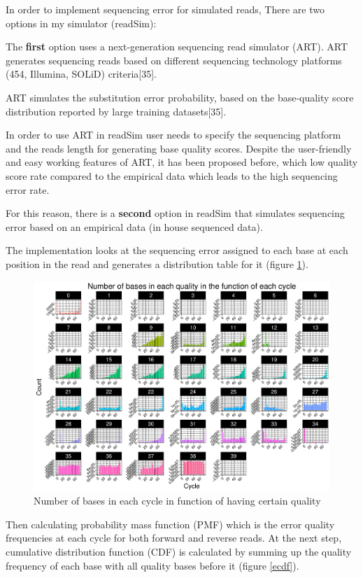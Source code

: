 \documentclass[11pt,a4paper]{report}
\begin{document}
In order to implement sequencing error for simulated reads, There are two
options in my simulator (readSim):

The \textbf{first} option uses a next-generation sequencing read simulator (ART). 
ART generates sequencing reads based on different sequencing technology 
platforms (454, Illumina, SOLiD) criteria[35].

ART simulates the substitution error probability, based on the base-quality 
score distribution reported by large training datasets[35].

In order to use ART in readSim user needs to specify the sequencing platform 
and the reads length for generating base quality scores. Despite the user-friendly 
and easy working features of ART, it has been proposed before, which low quality score 
rate compared to the empirical data\cite{bwa} which leads to the high sequencing
error rate.

For this reason, there is a \textbf{second} option in readSim that simulates
sequencing error based on an empirical data (in house sequenced data).

The implementation looks at the sequencing error assigned to each base at each
position in the read and generates a distribution table for it (figure \ref{hist}).

\begin{figure}[H]
\centering
\includegraphics[width=12cm]{pictures/Rplot_quality.pdf}
\caption{Number of bases in each cycle in function of having certain quality}
\label{hist}
\end{figure}

Then calculating probability mass function (PMF) which is the error quality 
frequencies at each cycle for both forward and reverse reads. At the next 
step, cumulative distribution function (CDF) is calculated by summing up the 
quality frequency of each base with all quality bases before it (figure \ref{ecdf}).
\end{document}
